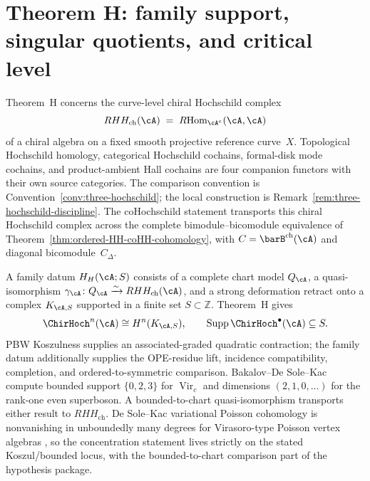 %

\chapter{Theorem H: family support, singular quotients, and critical level}
\label{chap:theorem-h-off-koszul-platonic}

Theorem~H concerns the curve-level chiral Hochschild complex
\[
 RHH_{\mathrm{ch}}(\cA)
 \;=\;
 R\mathrm{Hom}_{\cA^e}(\cA,\cA)
\]
of a chiral algebra on a fixed smooth projective reference curve~$X$.
Topological Hochschild homology, categorical Hochschild cochains,
formal-disk mode cochains, and product-ambient Hall cochains are four
companion functors with their own source categories.  The comparison
convention is
Convention~\ref{conv:three-hochschild}; the local construction is
Remark~\ref{rem:three-hochschild-discipline}.
The coHochschild statement transports this chiral Hochschild complex
across the complete bimodule--bicomodule equivalence of
Theorem~\ref{thm:ordered-HH-coHH-cohomology}, with
$C=\barB^{\mathrm{ch}}(\cA)$ and diagonal bicomodule~$C_\Delta$.

A family datum $H_H(\cA;S)$ consists of a complete chart model
$Q_\cA$, a quasi-isomorphism
$\gamma_\cA\colon Q_\cA\xrightarrow{\sim}
RHH_{\mathrm{ch}}(\cA)$, and a strong deformation retract onto a
complex $K_{\cA,S}$ supported in a finite set
$S\subset\mathbb Z$.  Theorem~H gives
\[
 \ChirHoch^n(\cA)\cong H^n(K_{\cA,S}),
 \qquad
 \operatorname{Supp}\ChirHoch^\bullet(\cA)\subseteq S.
\]
PBW Koszulness supplies an associated-graded quadratic contraction;
the family datum additionally supplies the OPE-residue lift, incidence
compatibility, completion, and ordered-to-symmetric comparison.
Bakalov--De Sole--Kac compute bounded support $\{0,2,3\}$ for
$\operatorname{Vir}_c$ and dimensions $(2,1,0,\ldots)$ for the
rank-one even superboson.  A bounded-to-chart quasi-isomorphism
transports either result to $RHH_{\mathrm{ch}}$.  De Sole--Kac
variational Poisson cohomology is nonvanishing in unboundedly many
degrees for Virasoro-type Poisson vertex algebras \cite{BDSK21}, so
the concentration statement lives strictly on the stated
Koszul/bounded locus, with the bounded-to-chart comparison part of
the hypothesis package.

